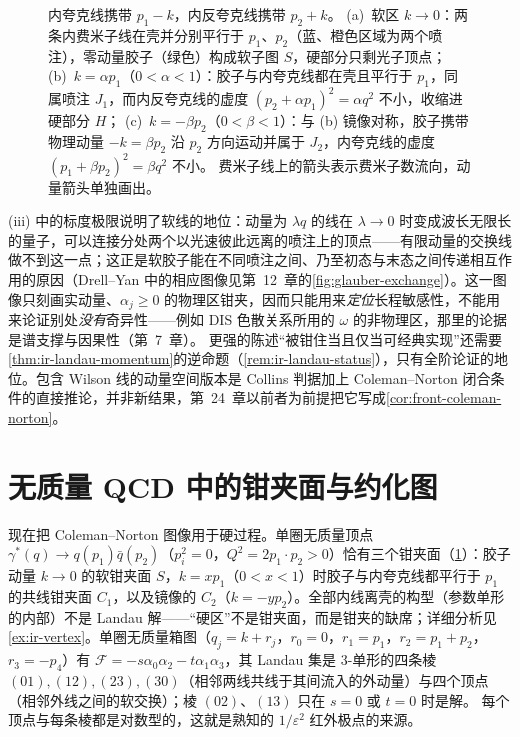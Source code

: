 \begin{figure}[htbp]
{内夸克线携带 $p_1-k$，内反夸克线携带 $p_2+k$。
(a)~软区 $k\to0$：两条内费米子线在壳并分别平行于 $p_1$、$p_2$（蓝、橙色区域为两个喷注），零动量胶子（绿色）构成软子图 $S$，硬部分只剩光子顶点；
(b)~$k=\alpha p_1$（$0<\alpha<1$）：胶子与内夸克线都在壳且平行于 $p_1$，同属喷注 $J_1$，而内反夸克线的虚度 $(p_2+\alpha p_1)^2=\alpha q^2$ 不小，收缩进硬部分 $H$；
(c)~$k=-\beta p_2$（$0<\beta<1$）：与 (b) 镜像对称，胶子携带物理动量 $-k=\beta p_2$ 沿 $p_2$ 方向运动并属于 $J_2$，内夸克线的虚度 $(p_1+\beta p_2)^2=\beta q^2$ 不小。
费米子线上的箭头表示费米子数流向，动量箭头单独画出。}
\label{fig:vertex-regions}
\end{figure}

(iii) 中的标度极限说明了软线的地位：动量为 $\lambda q$ 的线在 $\lambda\to0$ 时变成波长无限长的量子，可以连接分处两个以光速彼此远离的喷注上的顶点——有限动量的交换线做不到这一点；这正是软胶子能在不同喷注之间、乃至初态与末态之间传递相互作用的原因（Drell--Yan 中的相应图像见第~12~章的\cref{fig:glauber-exchange}）。这一图像只刻画实动量、$\alpha_j\ge0$ 的物理区钳夹，因而只能用来\emph{定位}长程敏感性，不能用来论证别处\emph{没有}奇异性——例如 DIS 色散关系所用的 $\omega$ 的非物理区，那里的论据是谱支撑与因果性（第~7~章）。%
更强的陈述“被钳住当且仅当可经典实现”还需要\cref{thm:ir-landau-momentum}的逆命题（\cref{rem:ir-landau-status}），只有全阶论证的地位。包含 Wilson 线的动量空间版本是 Collins 判据加上 Coleman--Norton 闭合条件的直接推论，并非新结果，第~24~章以前者为前提把它写成\cref{cor:front-coleman-norton}。
\section{无质量 QCD 中的钳夹面与约化图}\label{sec:ir-pinch}

现在把 Coleman--Norton 图像用于硬过程。单圈无质量顶点 $\gamma^*(q)\to q(p_1)\bar q(p_2)$（$p_i^2=0$，$Q^2=2p_1\cdot p_2>0$）恰有三个钳夹面（\cref{fig:vertex-regions}）：胶子动量 $k\to0$ 的软钳夹面 $S$，$k=xp_1$（$0<x<1$）时胶子与内夸克线都平行于 $p_1$ 的共线钳夹面 $C_1$，以及镜像的 $C_2$（$k=-yp_2$）。全部内线离壳的构型（参数单形的内部）不是 Landau 解——“硬区”不是钳夹面，而是钳夹的缺席；详细分析见\cref{ex:ir-vertex}。单圈无质量箱图（$q_j=k+r_j$，$r_0=0$，$r_1=p_1$，$r_2=p_1+p_2$，$r_3=-p_4$）有 $\mathcal F=-s\alpha_0\alpha_2-t\alpha_1\alpha_3$，其 Landau 集是 3-单形的四条棱 $(01),(12),(23),(30)$（相邻两线共线于其间流入的外动量）与四个顶点（相邻外线之间的软交换）；棱 $(02)$、$(13)$ 只在 $s=0$ 或 $t=0$ 时是解。%
每个顶点与每条棱都是对数型的，这就是熟知的 $1/\varepsilon^2$ 红外极点的来源。

